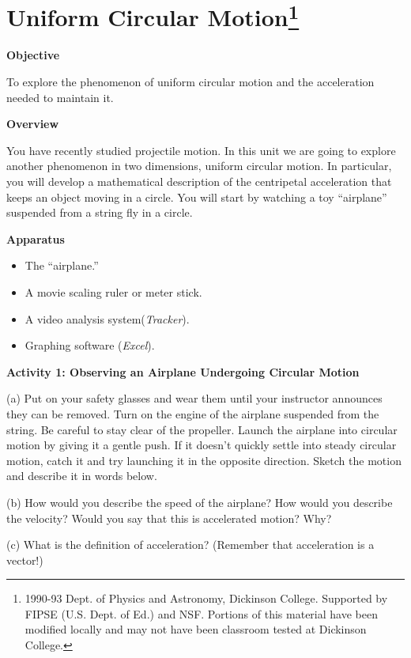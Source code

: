 
\section{Uniform Circular Motion\footnote{
1990-93 Dept. of Physics and Astronomy, Dickinson College. Supported by FIPSE
(U.S. Dept. of Ed.) and NSF. Portions of this material have been modified locally
and may not have been classroom tested at Dickinson College.
}}

\makelabheader %

\textbf{Objective }

To explore the phenomenon of uniform circular motion and the acceleration needed
to maintain it.

\textbf{Overview} 

You have recently studied projectile motion. In this unit we are going to explore
another phenomenon in two dimensions, uniform circular motion. In particular,
you will develop a mathematical description of the centripetal acceleration
that keeps an object moving in a circle. You will start by watching a toy ``airplane''
suspended from a string fly in a circle.

\textbf{Apparatus}

\begin{itemize}
\item The ``airplane.''
\item A movie scaling ruler or meter stick.
\item A video analysis system(\textit{Tracker}). 
\item Graphing software (\textit{Excel}).
\end{itemize}
\textbf{Activity 1: Observing an Airplane Undergoing Circular Motion} 

(a) Put on your safety glasses and wear them until your instructor announces
they can be removed. Turn on the engine of the airplane suspended from
the string. Be careful to stay clear of the propeller. Launch the airplane into
circular motion by giving it a gentle push. If it doesn't quickly settle into
steady circular motion, catch it and try launching it in the opposite direction.
Sketch the motion and describe it in words below. 
\answerspace{30mm}

(b) How would you describe the speed of the airplane? How would you
describe the velocity? Would you say that this is accelerated motion? Why?
\answerspace{15mm}

(c) What is the definition of acceleration? (Remember that acceleration is a vector!)
\answerspace{15mm}

